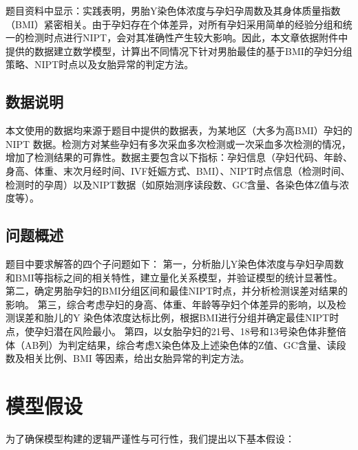 \documentclass[withoutpreface]{cumcmthesis}
\begin{document}
题目资料中显示：实践表明，男胎Y染色体浓度与孕妇孕周数及其身体质量指数（BMI）紧密相关。由于孕妇存在个体差异，对所有孕妇采用简单的经验分组和统一的检测时点进行NIPT，会对其准确性产生较大影响。因此，本文章依据附件中提供的数据建立数学模型，计算出不同情况下针对男胎最佳的基于BMI的孕妇分组策略、NIPT时点以及女胎异常的判定方法。
\subsection{数据说明}
本文使用的数据均来源于题目中提供的数据表，为某地区（大多为高BMI）孕妇的NIPT 数据。检测方对某些孕妇有多次采血多次检测或一次采血多次检测的情况，增加了检测结果的可靠性。数据主要包含以下指标：孕妇信息（孕妇代码、年龄、身高、体重、末次月经时间、IVF妊娠方式、BMI）、NIPT时点信息（检测时间、检测时的孕周）以及NIPT数据（如原始测序读段数、GC含量、各染色体Z值与浓度等）。

\subsection{问题概述}
题目中要求解答的四个子问题如下：
第一，分析胎儿Y染色体浓度与孕妇孕周数和BMI等指标之间的相关特性，建立量化关系模型，并验证模型的统计显著性。
第二，确定男胎孕妇的BMI分组区间和最佳NIPT时点，并分析检测误差对结果的影响。
第三，综合考虑孕妇的身高、体重、年龄等孕妇个体差异的影响，以及检测误差和胎儿的Y 染色体浓度达标比例，根据BMI进行分组并确定最佳NIPT时点，使孕妇潜在风险最小。
第四，以女胎孕妇的21号、18号和13号染色体非整倍体（AB列）为判定结果，综合考虑X染色体及上述染色体的Z值、GC含量、读段数及相关比例、BMI 等因素，给出女胎异常的判定方法。

\section{模型假设}

为了确保模型构建的逻辑严谨性与可行性，我们提出以下基本假设：
\end{document}
